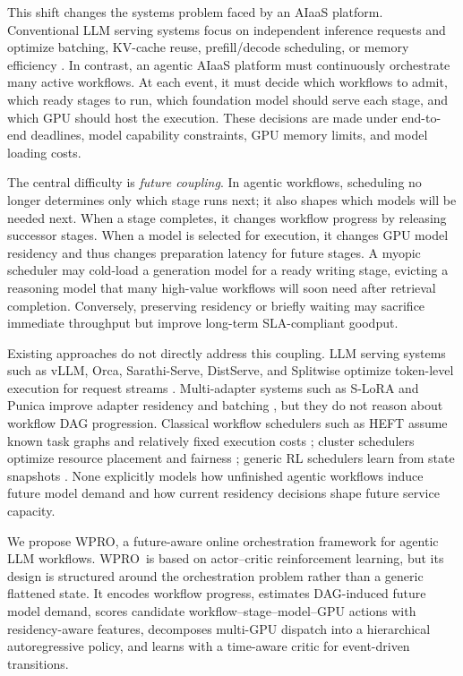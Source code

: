 \documentclass[10pt,conference]{IEEEtran}
\newcommand{\WPRO}{\textsc{WPRO}}
\begin{document}
This shift changes the systems problem faced by an AIaaS platform. Conventional LLM serving systems focus on independent inference requests and optimize batching, KV-cache reuse, prefill/decode scheduling, or memory efficiency \cite{kwon2023vllm,yu2022orca,agrawal2024sarathi,zhong2024distserve}. In contrast, an agentic AIaaS platform must continuously orchestrate many active workflows. At each event, it must decide which workflows to admit, which ready stages to run, which foundation model should serve each stage, and which GPU should host the execution. These decisions are made under end-to-end deadlines, model capability constraints, GPU memory limits, and model loading costs.

The central difficulty is \emph{future coupling}. In agentic workflows, scheduling no longer determines only which stage runs next; it also shapes which models will be needed next. When a stage completes, it changes workflow progress by releasing successor stages. When a model is selected for execution, it changes GPU model residency and thus changes preparation latency for future stages. A myopic scheduler may cold-load a generation model for a ready writing stage, evicting a reasoning model that many high-value workflows will soon need after retrieval completion. Conversely, preserving residency or briefly waiting may sacrifice immediate throughput but improve long-term SLA-compliant goodput.

Existing approaches do not directly address this coupling. LLM serving systems such as vLLM, Orca, Sarathi-Serve, DistServe, and Splitwise optimize token-level execution for request streams \cite{kwon2023vllm,yu2022orca,agrawal2024sarathi,zhong2024distserve,patel2024splitwise}. Multi-adapter systems such as S-LoRA and Punica improve adapter residency and batching \cite{sheng2023slora,chen2023punica}, but they do not reason about workflow DAG progression. Classical workflow schedulers such as HEFT assume known task graphs and relatively fixed execution costs \cite{topcuoglu2002heft}; cluster schedulers optimize resource placement and fairness \cite{gog2016firmament,gu2019tiresias,xiao2018gandiva}; generic RL schedulers learn from state snapshots \cite{mao2016deeprm,mao2019decima}. None explicitly models how unfinished agentic workflows induce future model demand and how current residency decisions shape future service capacity.

We propose \WPRO, a future-aware online orchestration framework for agentic LLM workflows. \WPRO\ is based on actor--critic reinforcement learning, but its design is structured around the orchestration problem rather than a generic flattened state. It encodes workflow progress, estimates DAG-induced future model demand, scores candidate workflow--stage--model--GPU actions with residency-aware features, decomposes multi-GPU dispatch into a hierarchical autoregressive policy, and learns with a time-aware critic for event-driven transitions.
\end{document}
